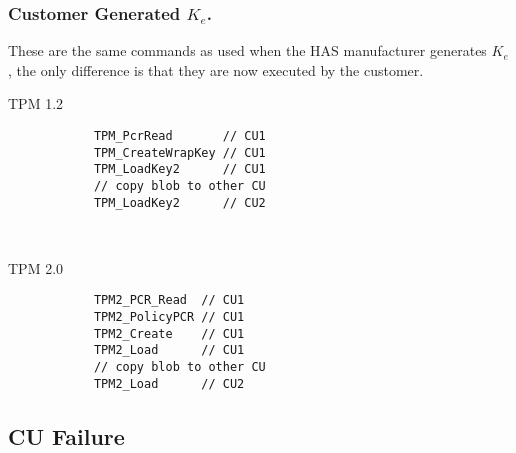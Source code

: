 {\subsubsection{Customer Generated $K_e$.}
These are the same commands as used when the HAS manufacturer generates $K_e$, the only difference is that they are now executed by the customer.
\begin{center}
	\begin{minipage}{0.4\linewidth}
		\begin{center}
			TPM 1.2
		\end{center}
		\begin{tpmcommands}
			\begin{verbatim}
			TPM_PcrRead       // CU1
			TPM_CreateWrapKey // CU1
			TPM_LoadKey2      // CU1
			// copy blob to other CU
			TPM_LoadKey2      // CU2
			\end{verbatim}
		\end{tpmcommands}
	\end{minipage}
	~~~~~~~~
	\begin{minipage}{0.4\linewidth}
		\begin{center}
			TPM 2.0
		\end{center}
		\begin{tpmcommands}
			\begin{verbatim}
			TPM2_PCR_Read  // CU1
			TPM2_PolicyPCR // CU1
			TPM2_Create    // CU1
			TPM2_Load      // CU1
			// copy blob to other CU
			TPM2_Load      // CU2
			\end{verbatim}
		\end{tpmcommands}
	\end{minipage}
\end{center}

\subsection{CU Failure}

}
